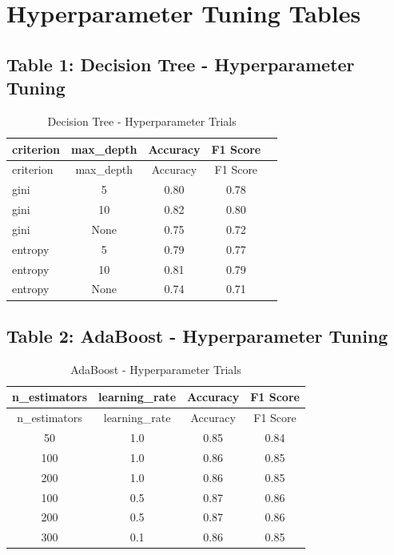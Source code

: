 \documentclass[11pt]{article}
\begin{document}
\section{Hyperparameter Tuning Tables}

\subsection{Table 1: Decision Tree - Hyperparameter Tuning}
\begin{longtable}{l c c c c}
\caption{Decision Tree - Hyperparameter Trials}\\
\toprule
criterion & max\_depth & Accuracy & F1 Score \\
\midrule
\endfirsthead
\toprule
criterion & max\_depth & Accuracy & F1 Score \\
\midrule
\endhead
gini & 5 & 0.80 & 0.78 \\
gini & 10 & 0.82 & 0.80 \\
gini & None & 0.75 & 0.72 \\
entropy & 5 & 0.79 & 0.77 \\
entropy & 10 & 0.81 & 0.79 \\
entropy & None & 0.74 & 0.71 \\
\bottomrule
\end{longtable}

\bigskip

\subsection{Table 2: AdaBoost - Hyperparameter Tuning}
\begin{longtable}{c c c c}
\caption{AdaBoost - Hyperparameter Trials}\\
\toprule
n\_estimators & learning\_rate & Accuracy & F1 Score \\
\midrule
\endfirsthead
\toprule
n\_estimators & learning\_rate & Accuracy & F1 Score \\
\midrule
\endhead
50 & 1.0 & 0.85 & 0.84 \\
100 & 1.0 & 0.86 & 0.85 \\
200 & 1.0 & 0.86 & 0.85 \\
100 & 0.5 & 0.87 & 0.86 \\
200 & 0.5 & 0.87 & 0.86 \\
300 & 0.1 & 0.86 & 0.85 \\
\bottomrule
\end{longtable}
\end{document}
